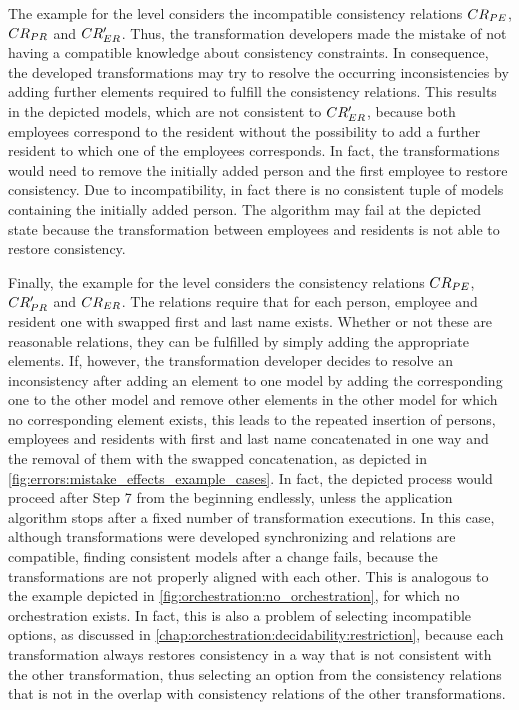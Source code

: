 The example for the \levelnetworkrelation level considers the incompatible consistency relations $CR_{PE}$, $CR_{PR}$ and $CR_{ER}'$. Thus, the transformation developers made the mistake of not having a compatible knowledge about consistency constraints.
In consequence, the developed transformations may try to resolve the occurring inconsistencies by adding further elements required to fulfill the consistency relations.
This results in the depicted models, which are not consistent to $CR_{ER}'$, because both employees correspond to the resident without the possibility to add a further resident to which one of the employees corresponds.
In fact, the transformations would need to remove the initially added person and the first employee to restore consistency.
Due to incompatibility, in fact there is no consistent tuple of models containing the initially added person.
The algorithm may fail at the depicted state because the transformation between employees and residents is not able to restore consistency.

Finally, the example for the \levelnetworkrule level considers the consistency relations $CR_{PE}$, $CR_{PR}'$ and $CR_{ER}$.
The relations require that for each person, employee and resident one with swapped first and last name exists.
Whether or not these are reasonable relations, they can be fulfilled by simply adding the appropriate elements.
If, however, the transformation developer decides to resolve an inconsistency after adding an element to one model by adding the corresponding one to the other model and remove other elements in the other model for which no corresponding element exists, this leads to the repeated insertion of persons, employees and residents with first and last name concatenated in one way and the removal of them with the swapped concatenation, as depicted in \autoref{fig:errors:mistake_effects_example_cases}.
In fact, the depicted process would proceed after Step 7 from the beginning endlessly, unless the application algorithm stops after a fixed number of transformation executions.
In this case, although transformations were developed synchronizing and relations are compatible, finding consistent models after a change fails, because the transformations are not properly aligned with each other.
This is analogous to the example depicted in \autoref{fig:orchestration:no_orchestration}, for which no orchestration exists.
In fact, this is also a problem of selecting incompatible options, as discussed in \autoref{chap:orchestration:decidability:restriction}, because each transformation always restores consistency in a way that is not consistent with the other transformation, thus selecting an option from the consistency relations that is not in the overlap with consistency relations of the other transformations.

